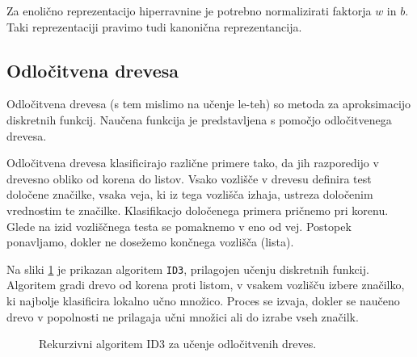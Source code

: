 \documentclass[11pt,a4paper,openany]{book}
\begin{document}
Za enolično reprezentacijo hiperravnine je potrebno normalizirati faktorja $w$ in $b$. Taki reprezentaciji pravimo tudi kanonična reprezentancija.



\subsection{Odločitvena drevesa}
\label{sc:decisiontrees}
Odločitvena drevesa (s tem mislimo na učenje le-teh) so metoda za aproksimacijo diskretnih funkcij. Naučena funkcija je predstavljena s pomočjo odločitvenega drevesa\cite{Mitchell1997}. 

Odločitvena drevesa klasificirajo različne primere tako, da jih razporedijo v drevesno obliko od korena do listov. Vsako vozlišče v drevesu definira test določene značilke, vsaka veja, ki iz tega vozlišča izhaja, ustreza določenim vrednostim te značilke. Klasifikacjo določenega primera pričnemo pri korenu. Glede na izid vozliščnega testa se pomaknemo v eno od vej. Postopek ponavljamo, dokler ne dosežemo končnega vozlišča (lista).

Na sliki \ref{sl:algo-id3} je prikazan algoritem \texttt{ID3}, prilagojen učenju diskretnih funkcij. Algoritem gradi drevo od korena proti listom, v vsakem vozlišču izbere značilko, ki najbolje klasificira lokalno učno množico. Proces se izvaja, dokler se naučeno drevo v popolnosti ne prilagaja učni množici ali do izrabe vseh značilk.

\SetStartEndCondition{ }{}{}

\begin{figure}[h!]
	\begin{algorithm}[H]				
	\end{algorithm}
	\caption{Rekurzivni algoritem ID3 za učenje odločitvenih dreves.}
	\label{sl:algo-id3}	
\end{figure}
\end{document}
